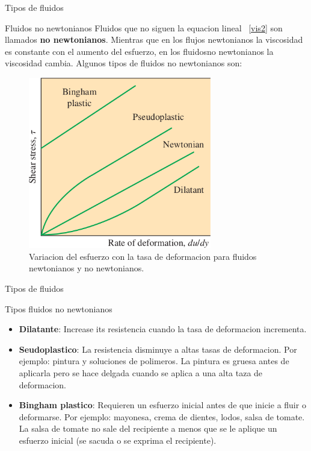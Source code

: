 \documentclass [xcolor=svgnames, t] {beamer}
\begin{document}
\begin{frame}{Tipos de fluidos}
\begin{block}{Fluidos no newtonianos}
Fluidos que no siguen la equacion lineal ~\ref{vis2} son llamados \textbf{no newtonianos}. Mientras que en los flujos newtonianos la viscosidad es constante con el aumento del esfuerzo, en los fluidosno newtonianos la viscosidad cambia. Algunos tipos de fluidos no newtonianos son:
\end{block}
\begin{figure}[h]
\centering
\includegraphics[width=8cm]{nonew}
\caption{Variacion del esfuerzo con la tasa de deformacion para fluidos newtonianos y no newtonianos.}
\label{nonew}
\end{figure}
\end{frame}

\begin{frame}{Tipos de fluidos}
\begin{block}{Tipos fluidos no newtonianos}
\begin{itemize}
\item \textbf{Dilatante}: Increase its resistencia cuando la tasa de deformacion incrementa.
\item \textbf{Seudoplastico}: La resistencia disminuye a altas tasas de deformacion. Por ejemplo: pintura y soluciones de polimeros. La pintura es gruesa antes de aplicarla pero se hace delgada cuando se aplica a una alta taza de deformacion.
\item \textbf{Bingham plastico}: Requieren un esfuerzo inicial antes de que inicie a fluir o deformarse. Por ejemplo: mayonesa, crema de dientes, lodos, salsa de tomate. La salsa de tomate no sale del recipiente a menos que se le aplique un esfuerzo inicial (se sacuda o se exprima el recipiente). 
\end{itemize}
\end{block}
\end{frame}
\end{document}
